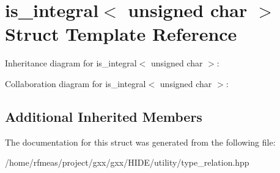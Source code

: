 \hypertarget{structis__integral_3_01unsigned_01char_01_4}{}\section{is\+\_\+integral$<$ unsigned char $>$ Struct Template Reference}
\label{structis__integral_3_01unsigned_01char_01_4}


Inheritance diagram for is\+\_\+integral$<$ unsigned char $>$\+:


Collaboration diagram for is\+\_\+integral$<$ unsigned char $>$\+:
\subsection*{Additional Inherited Members}


The documentation for this struct was generated from the following file\+:\begin{DoxyCompactItemize}
\item 
/home/rfmeas/project/gxx/gxx/\+H\+I\+D\+E/utility/type\+\_\+relation.\+hpp\end{DoxyCompactItemize}
